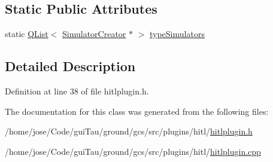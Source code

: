 \subsection*{Static Public Attributes}
\begin{DoxyCompactItemize}
\item 
static \hyperlink{class_q_list}{Q\-List}$<$ \hyperlink{class_simulator_creator}{Simulator\-Creator} $\ast$ $>$ \hyperlink{group___h_i_t_l_plugin_ga0400c2f74f4a0c3cd840f95c99b1b601}{type\-Simulators}
\end{DoxyCompactItemize}


\subsection{Detailed Description}


Definition at line 38 of file hitlplugin.\-h.



The documentation for this class was generated from the following files\-:\begin{DoxyCompactItemize}
\item 
/home/jose/\-Code/gui\-Tau/ground/gcs/src/plugins/hitl/\hyperlink{hitlplugin_8h}{hitlplugin.\-h}\item 
/home/jose/\-Code/gui\-Tau/ground/gcs/src/plugins/hitl/\hyperlink{hitlplugin_8cpp}{hitlplugin.\-cpp}\end{DoxyCompactItemize}
